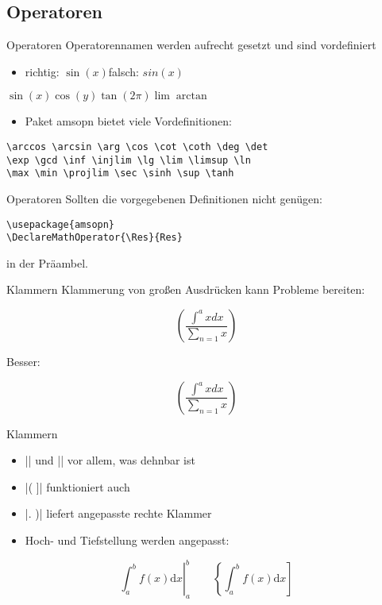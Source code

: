 \documentclass[
	vorläufig=true,
	datum=2016-11-04,
	titel={Mathematiksatz I},
	web=false,
]{../tex/latexkurs-slides}
\begin{document}
\subsection{Operatoren}
\begin{frame}[fragile]{Operatoren}
Operatorennamen werden aufrecht gesetzt und sind vordefiniert
	\begin{itemize}
		\item richtig: $\sin(x)$\quad falsch: $sin(x)$
	\end{itemize}
\begin{LTXexample}[pos=b]
$\sin(x) \cos(y) \tan(2\pi) \lim \arctan$
\end{LTXexample}
	\pause
	\begin{itemize}
		\item Paket amsopn bietet viele Vordefinitionen:
	\end{itemize}
\begin{lstlisting}
\arccos \arcsin \arg \cos \cot \coth \deg \det
\exp \gcd \inf \injlim \lg \lim \limsup \ln
\max \min \projlim \sec \sinh \sup \tanh
\end{lstlisting}
\end{frame}

\begin{frame}[fragile]{Operatoren}
Sollten die vorgegebenen Definitionen nicht genügen:
\begin{lstlisting}
\usepackage{amsopn}
\DeclareMathOperator{\Res}{Res}
\end{lstlisting}
in der Präambel.
\end{frame}

\begin{frame}[fragile]{Klammern}
Klammerung von großen Ausdrücken kann Probleme bereiten:
\begin{LTXexample}
\[ (
  \frac{\int^a x dx}{\sum_{n=1} x}
) \]
\end{LTXexample}
Besser:
\begin{LTXexample}
\[ \left(
  \frac{\int^a x dx}{\sum_{n=1} x}
\right) \]
\end{LTXexample}
\end{frame}


\begin{frame}[fragile]{Klammern}
\begin{itemize}
\item |\left| und |\right| vor allem, was dehnbar ist
\item |\left( \right]| funktioniert auch
\item |\left. \right)| liefert angepasste rechte Klammer
\item Hoch- und Tiefstellung werden angepasst:
\end{itemize}
\begin{LTXexample}[pos=b]
\begin{displaymath}
  \left. \int_a^b f(x) \mathrm dx \right\vert_a^b
  \qquad
  \left\{ \int_a^b f(x) \mathrm dx \right]
\end{displaymath}
\end{LTXexample}
\end{frame}
\end{document}
